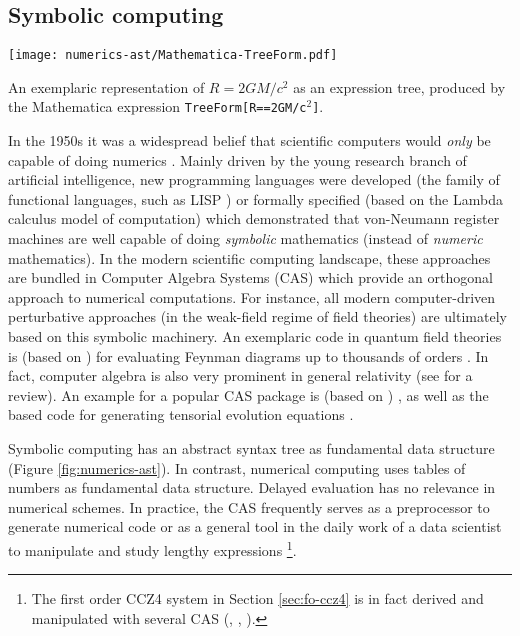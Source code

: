 \subsection{Symbolic computing}\label{sec:symbolic-computing}
\begin{marginfigure}
	\texttt{[image: numerics-ast/Mathematica-TreeForm.pdf]}
	\caption[
	  Expression tree cartoon, output by Mathematica, \exclusive
	]{An exemplaric representation of $R=2GM/c^2$ as an expression tree, 
	produced by the Mathematica expression \texttt{TreeForm[R==2GM/c$^2$]}.
	}\label{fig:numerics-ast}
\end{marginfigure}
%
In the 1950s it was a widespread belief that
scientific computers would \emph{only} be capable of doing numerics \cite{SuperintelligenceBook}.
Mainly driven by the young research branch of artificial intelligence, new programming
languages were developed (the family of functional languages, such as LISP
\cite{LISP}) or formally specified (based on the Lambda calculus model of
computation) which demonstrated that von-Neumann register machines are well capable of
doing \emph{symbolic} mathematics (instead of \emph{numeric} mathematics).
In the modern scientific computing landscape, these
approaches are bundled in Computer Algebra Systems (CAS) which provide
an orthogonal approach to numerical computations. For instance, all modern computer-driven
perturbative approaches (in the weak-field regime of field theories) are
ultimately based on this symbolic machinery. An exemplaric code in quantum field
theories is  (based on ) for evaluating Feynman 
diagrams
up to thousands of orders \cite{xloopsPhd,Brucher:1998qd}. In fact, computer algebra is
also very prominent in general relativity (see \cite{MacCallum2018} for a review).
An example for a popular CAS package
is  (based on ) 
\cite{Gourgoulhon:2018yss,Bicak:2014vna,Gourgoulhon:2014ywa}, as well as the
 based  code for generating tensorial
evolution equations \cite{kranc04,Husa:2004ip}.

Symbolic computing has an abstract syntax tree as fundamental data structure
(Figure \ref{fig:numerics-ast}). In contrast, numerical computing uses tables of
numbers as fundamental data structure. Delayed evaluation has no relevance
in numerical schemes. In practice, the CAS frequently serves as a
preprocessor to generate numerical code or as a general tool in the daily work of a
data scientist to manipulate and study lengthy expressions
\footnote{The first order CCZ4 system in Section \vref{sec:fo-ccz4} is in fact
	derived and	manipulated with several CAS (,
	, ).
}.


